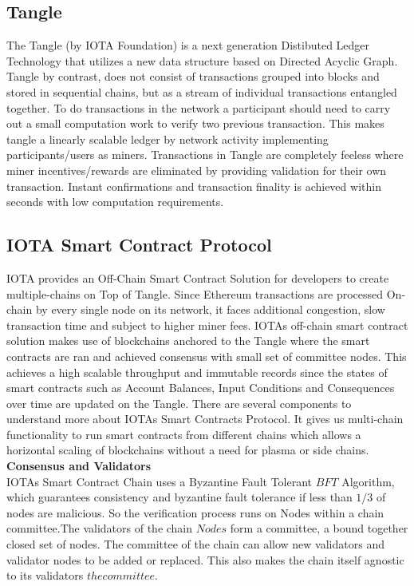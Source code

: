 \documentclass[10pt]{article}
\begin{document}
\subsection{Tangle}

The Tangle (by IOTA Foundation) is a next generation Distibuted Ledger Technology that utilizes a new data structure based on Directed Acyclic Graph. Tangle by contrast, does not consist of transactions grouped into blocks and stored in sequential chains, but as a stream of individual transactions entangled together. To do transactions in the network a participant should need to carry out a small computation work to verify two previous transaction. This makes tangle a linearly scalable ledger by network activity implementing participants/users as miners. Transactions in Tangle are completely feeless where miner incentives/rewards are eliminated by providing validation for their own transaction. Instant confirmations and transaction finality is achieved within seconds with low computation requirements.

\subsection{IOTA Smart Contract Protocol}

IOTA provides an Off-Chain Smart Contract Solution for developers to create multiple-chains on Top of Tangle. Since Ethereum transactions are processed On-chain by every single node on its network, it faces additional congestion, slow transaction time and subject to higher miner fees. IOTA\textsc{}s off-chain smart contract solution makes use of blockchains anchored to the Tangle where the smart contracts are ran and achieved consensus with small set of committee nodes. This achieves a high scalable throughput and immutable records since the states of smart contracts such as Account Balances, Input Conditions and Consequences over time are updated on the Tangle. There are several components to understand more about IOTA\textsc{}s Smart Contracts Protocol. It gives us multi-chain functionality to run smart contracts from different chains which allows a horizontal scaling of blockchains without a need for plasma or side chains.\\

\textbf{Consensus and Validators}\\

IOTA\textsc{}s Smart Contract Chain uses a Byzantine Fault Tolerant \(BFT\) Algorithm, which guarantees consistency and byzantine fault tolerance if less than $1/3$ of nodes are malicious. So the verification process runs on Nodes within a chain committee.The validators of the chain \(Nodes\) form a committee, a bound together closed set of nodes. The committee of the chain can allow new validators and validator nodes to be added or replaced. This also makes the chain itself agnostic to its validators \(the committee\).\\
\end{document}
